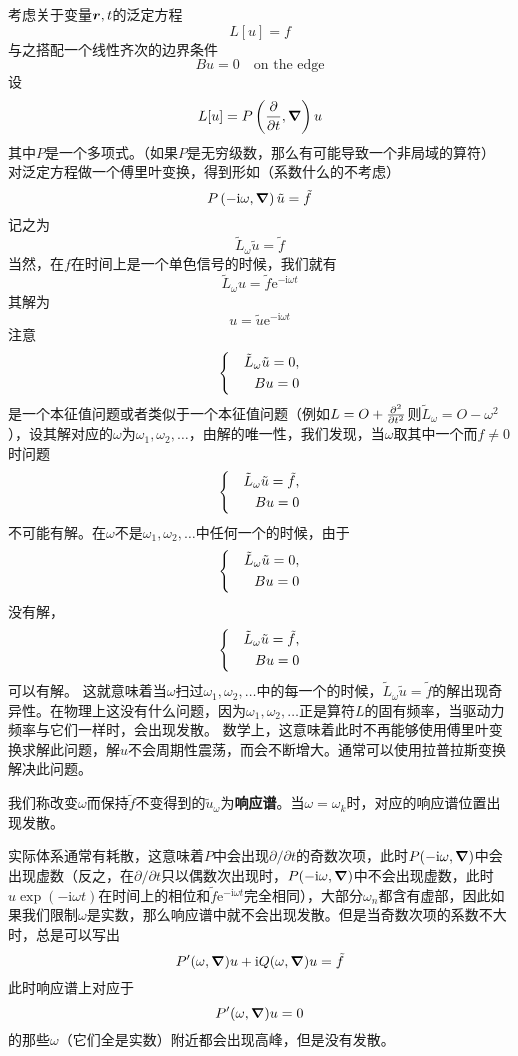 \documentclass[UTF8]{ctexart}
\newenvironment{bigcase}{\left\{ \quad \begin{aligned}}{\end{aligned}\right.}
\newcommand*{\ii}{\mathrm{i}}
\newcommand*{\ee}{\mathrm{e}}
\begin{document}
考虑关于变量$\vb*{r}, t$的泛定方程
\[
    L[u] = f
\]
与之搭配一个线性齐次的边界条件
\[
    B u = 0 \quad \text{on the edge}
\]
设
\[
    L[u] = P\left( \pdv{t}, \grad \right) u
\]
其中$P$是一个多项式。（如果$P$是无穷级数，那么有可能导致一个非局域的算符）
对泛定方程做一个傅里叶变换，得到形如（系数什么的不考虑）
\[
    P \left( -\ii \omega, \grad \right) \tilde{u} = \tilde{f}
\]
记之为
\[
    \tilde{L}_\omega \tilde{u} = \tilde{f}
\]
当然，在$f$在时间上是一个单色信号的时候，我们就有
\[
    \tilde{L}_\omega u = \tilde{f} \ee^{- \ii \omega t}
\]
其解为
\[
    u = \tilde{u} \ee^{- \ii \omega t}
\]
注意
\[
    \begin{bigcase}
        \tilde{L}_\omega \tilde{u} = 0, \\
        B u = 0
    \end{bigcase}
\]
是一个本征值问题或者类似于一个本征值问题（例如$L = O + \pdv[2]{t}$则$\tilde{L}_\omega = O - \omega^2$），设其解对应的$\omega$为$\omega_1, \omega_2, \ldots$，由解的唯一性，我们发现，当$\omega$取其中一个而$f \neq 0$时问题
\[
    \begin{bigcase}
        \tilde{L}_\omega \tilde{u} = \tilde{f}, \\
        B u = 0
    \end{bigcase}
\]
不可能有解。在$\omega$不是$\omega_1, \omega_2, \ldots$中任何一个的时候，由于
\[
    \begin{bigcase}
        \tilde{L}_\omega \tilde{u} = 0, \\
        B u = 0
    \end{bigcase}
\]
没有解，
\[
    \begin{bigcase}
        \tilde{L}_\omega \tilde{u} = \tilde{f}, \\
        B u = 0
    \end{bigcase}
\]
可以有解。
这就意味着当$\omega$扫过$\omega_1, \omega_2, \ldots$中的每一个的时候，$\tilde{L}_\omega \tilde{u} = \tilde{f}$的解出现奇异性。在物理上这没有什么问题，因为$\omega_1, \omega_2, \ldots$正是算符$L$的固有频率，当驱动力频率与它们一样时，会出现发散。
数学上，这意味着此时不再能够使用傅里叶变换求解此问题，解$u$不会周期性震荡，而会不断增大。通常可以使用拉普拉斯变换解决此问题。

我们称改变$\omega$而保持$\tilde{f}$不变得到的$\tilde{u}_\omega$为\textbf{响应谱}。当$\omega=\omega_k$时，对应的响应谱位置出现发散。


实际体系通常有耗散，这意味着$P$中会出现$\partial / \partial t$的奇数次项，此时$P(-\ii \omega ,\grad)$中会出现虚数（反之，在$\partial / \partial t$只以偶数次出现时，$P(-\ii \omega ,\grad)$中不会出现虚数，此时$u \exp(-\ii \omega t)$在时间上的相位和$\tilde{f} \ee^{- \ii \omega t}$完全相同），大部分$\omega_n$都含有虚部，因此如果我们限制$\omega$是实数，那么响应谱中就不会出现发散。但是当奇数次项的系数不大时，总是可以写出
\[
    P'(\omega, \grad) u + \ii Q(\omega, \grad) u = \tilde{f}
\]
此时响应谱上对应于
\[
    P'(\omega, \grad) u = 0
\]
的那些$\omega$（它们全是实数）附近都会出现高峰，但是没有发散。
\end{document}
